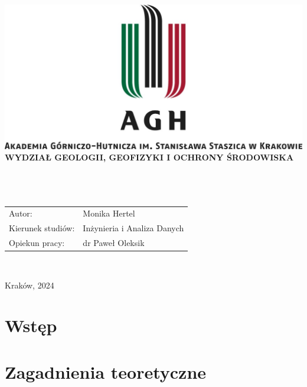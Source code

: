 \documentclass[12pt,a4paper,twoside]{article}
\begin{document}
\thispagestyle{empty}
\begin{center}
\includegraphics[width=\textwidth]{img/logo_AGH.jpg}\\
{\bf{\sf WYDZIAŁ GEOLOGII, GEOFIZYKI I OCHRONY ŚRODOWISKA}}\\[5mm]
{\bf{}}\\[14mm]

{}\\[12mm] 
{}\\[40mm]
\end{center}
{\sf\begin{tabular}{ll}
	Autor: & Monika Hertel\\
	Kierunek studiów: & Inżynieria i Analiza Danych\\
	Opiekun pracy: & dr Paweł Oleksik\\
\end{tabular}}\\[10mm]
\begin{center}
{\sf Kraków, 2024}
\end{center}
\newpage
\tableofcontents
\newpage
\section*{Wstęp}
\newpage
\section{Zagadnienia teoretyczne}
\end{document}
